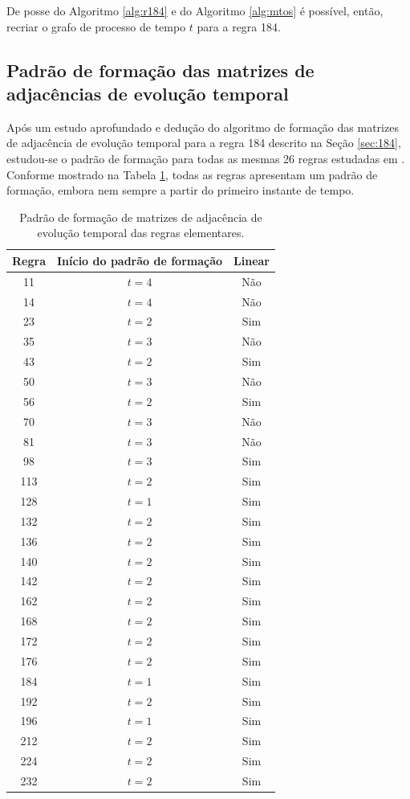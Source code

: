 \documentclass[12pt,a4paper]{article}
\begin{document}
De posse do Algoritmo \ref{alg:r184} e do Algoritmo \ref{alg:mtos} é
possível, então, recriar o grafo de processo de tempo $t$ para a regra 184.

\subsection{Padrão de formação das matrizes de adjacências de evolução temporal}\label{sec:pattern}

Após um estudo aprofundado e dedução do algoritmo de formação das matrizes
de adjacência de evolução temporal para a regra 184 descrito na Seção \ref{sec:184},
estudou-se o padrão de formação para todas as mesmas 26 regras estudadas em
. Conforme mostrado na Tabela \ref{tab:pattern},
todas as regras apresentam um padrão de formação, embora nem sempre a
partir do primeiro instante de tempo.

\begin{table}[htp]
\begin{center}
\begin{tabular}{c c c}
\hline
\textbf{Regra} & \textbf{Início do padrão de formação} & \textbf{Linear}\\ \hline
 11 & $t=4$ & Não \\
 14 & $t=4$ & Não \\
 23 & $t=2$ & Sim \\
 35 & $t=3$ & Não \\
 43 & $t=2$ & Sim \\
 50 & $t=3$ & Não \\
 56 & $t=2$ & Sim \\
 70 & $t=3$ & Não \\
 81 & $t=3$ & Não \\
 98 & $t=3$ & Sim \\
113 & $t=2$ & Sim \\
128 & $t=1$ & Sim \\
132 & $t=2$ & Sim \\
136 & $t=2$ & Sim \\
140 & $t=2$ & Sim \\
142 & $t=2$ & Sim \\
162 & $t=2$ & Sim \\
168 & $t=2$ & Sim \\
172 & $t=2$ & Sim \\
176 & $t=2$ & Sim \\
184 & $t=1$ & Sim \\
192 & $t=2$ & Sim \\
196 & $t=1$ & Sim \\
212 & $t=2$ & Sim \\
224 & $t=2$ & Sim \\
232 & $t=2$ & Sim \\
\end{tabular}
\caption{Padrão de formação de matrizes de adjacência de evolução temporal das
regras elementares.}
\label{tab:pattern}
\end{center}
\end{table}
\end{document}
